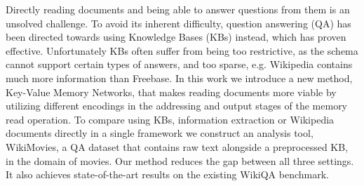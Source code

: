 Directly reading documents and being able to answer questions from them is an unsolved challenge. To avoid its inherent difficulty, question answering (QA) has been directed towards using Knowledge Bases (KBs) instead, which has proven effective. Unfortunately KBs often suffer from being too restrictive, as the schema cannot support certain types of answers, and too sparse, e.g. Wikipedia contains much more information than Freebase. In this work we introduce a new method, Key-Value Memory Networks, that makes reading documents more viable by utilizing different encodings in the addressing and output stages of the memory read operation. To compare using KBs, information extraction or Wikipedia documents directly in a single framework we construct an analysis tool, WikiMovies, a QA dataset that contains raw text alongside a preprocessed KB, in the domain of movies. Our method reduces the gap between all three settings. It also achieves state-of-the-art results on the existing WikiQA benchmark.
